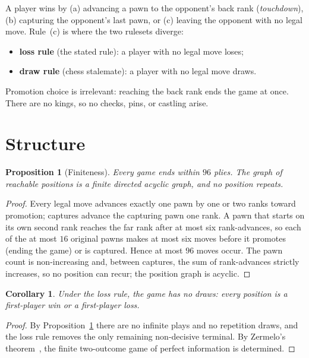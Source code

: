 \documentclass[Afour,sageapa,times]{sagej}
\theoremstyle{plain}
\newtheorem{proposition}{Proposition}
\newtheorem{corollary}{Corollary}
\theoremstyle{definition}
\begin{document}
A player wins by (a) advancing a pawn to the opponent's back rank
(\emph{touchdown}), (b) capturing the opponent's last pawn, or (c) leaving the
opponent with no legal move. Rule~(c) is where the two rulesets diverge:

\begin{itemize}
  \item \textbf{loss rule} (the stated rule): a player with no legal move loses;
  \item \textbf{draw rule} (chess stalemate): a player with no legal move draws.
\end{itemize}

Promotion choice is irrelevant: reaching the back rank ends the game at once.
There are no kings, so no checks, pins, or castling arise.

\section{Structure}\label{sec:structure}

\begin{proposition}[Finiteness]\label{prop:finite}
Every game ends within $96$ plies. The graph of reachable positions is a finite
directed acyclic graph, and no position repeats.
\end{proposition}

\begin{proof}
Every legal move advances exactly one pawn by one or two ranks toward promotion;
captures advance the capturing pawn one rank. A pawn that starts on its own
second rank reaches the far rank after at most six rank-advances, so each of the
at most $16$ original pawns makes at most six moves before it promotes (ending the
game) or is captured. Hence at most $96$ moves occur. The pawn count is
non-increasing and, between captures, the sum of rank-advances strictly
increases, so no position can recur; the position graph is acyclic.
\end{proof}

\begin{corollary}\label{cor:nodraw}
Under the loss rule, the game has no draws: every position is a first-player win
or a first-player loss.
\end{corollary}

\begin{proof}
By Proposition~\ref{prop:finite} there are no infinite plays and no repetition
draws, and the loss rule removes the only remaining non-decisive terminal. By
Zermelo's theorem~\cite{zermelo1913}, the finite two-outcome game of perfect
information is determined.
\end{proof}
\end{document}
